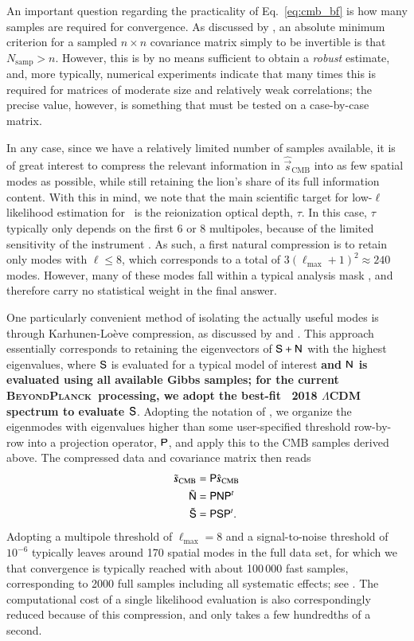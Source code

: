 \documentclass[twocolumn]{aa}
\newcommand{\s}[0]{\vec{s}}
\newcommand{\N}[0]{\tens{N}}
\renewcommand{\S}[0]{\tens{S}}
\renewcommand{\P}[0]{\tens{P}}
\newcommand{\BP}{\textsc{BeyondPlanck}}
\begin{document}
An important question regarding the practicality of
Eq.~\eqref{eq:cmb_bf} is how many samples are required for
convergence. As discussed by \citet{sellentin2016}, an absolute
minimum criterion for a sampled $n\times n$ covariance matrix simply
to be invertible is that $N_{\mathrm{samp}} > n$. However, this is by
no means sufficient to obtain a \emph{robust} estimate, and, more
typically, numerical experiments indicate that many times this is
required for matrices of moderate size and relatively weak
correlations; the precise value, however, is something that must be
tested on a case-by-case matrix.

In any case, since we have a relatively limited number of samples
available, it is of great interest to compress the relevant
information in $\hat{\s}_{\mathrm{CMB}}$ into as few spatial modes as
possible, while still retaining the lion's share of its full
information content. With this in mind, we note that the main
scientific target for low-$\ell$ likelihood estimation for \Planck\ is
the reionization optical depth, $\tau$. In this case, $\tau$
typically only depends on the first 6 or 8 multipoles, because of the
limited sensitivity of the instrument \citep{planck2016-l05}. As such,
a first natural compression is to retain only modes with $\ell \le 8$,
which corresponds to a total of $3(\ell_{\mathrm{max}}+1)^2\approx
240$ modes. However, many of these modes fall within a typical
analysis mask \citep{bp11}, and therefore carry no statistical weight
in the final answer.

One particularly convenient method of isolating the actually useful
modes is through Karhunen-Lo\`eve compression, as discussed by
\citet{tegmark1997} and \citet{gjerlow2015}. This approach essentially
corresponds to retaining the eigenvectors of $\S+\N$ with the highest
eigenvalues, where $\S$ is evaluated for a typical model of
interest {\bf and $\N$ is evaluated using all available Gibbs samples;
  for the current \BP\ processing, we adopt the best-fit \Planck\ 2018
  $\Lambda$CDM spectrum to evaluate $\S$}. Adopting the notation of
\citet{gjerlow2015}, we organize the eigenmodes with eigenvalues
higher than some user-specified threshold row-by-row into a projection
operator, $\P$, and apply this to the CMB samples derived above. The
compressed data and covariance matrix then reads
\begin{align}
  \tilde{\s}_{\mathrm{CMB}} &= \P\hat{\s}_{\mathrm{CMB}}\\
  \tilde{\N} &= \P\N\P^t \\
  \tilde{\S} &= \P\S\P^t.
\end{align}
Adopting a multipole threshold of $\ell_{\mathrm{max}}=8$ and a
signal-to-noise threshold of $10^{-6}$ typically leaves around 170
spatial modes in the full data set, for which we that convergence is
typically reached with about 100\,000 fast samples, corresponding to
2000 full samples including all systematic effects; see
\citet{bp12}. The computational cost of a single likelihood evaluation
is also correspondingly reduced because of this compression, and only
takes a few hundredths of a second.
\end{document}
